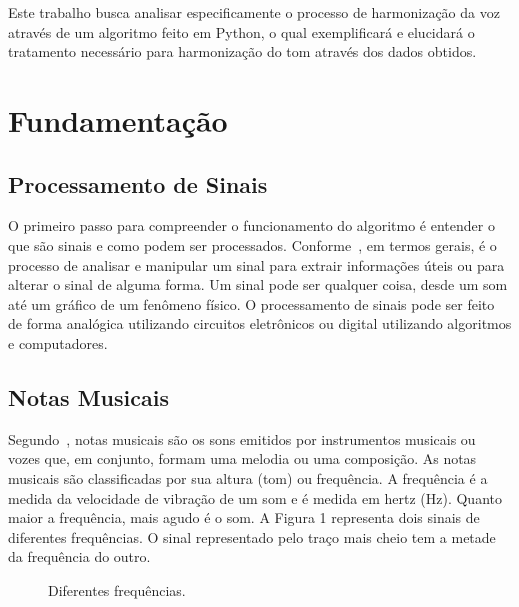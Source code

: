 \documentclass{sbrt}
\begin{document}
Este trabalho busca analisar especificamente o processo de harmonização da voz através de um algoritmo feito em Python,
o qual exemplificará e elucidará o tratamento necessário para harmonização do tom através dos dados obtidos.


\section{Fundamentação}

\subsection{Processamento de Sinais}

O primeiro passo para compreender o funcionamento do algoritmo é entender o que são sinais e como podem ser processados.
Conforme~\cite{prandoni2008signal}, em termos gerais, é o processo de analisar e manipular um sinal para extrair
informações úteis ou para alterar o sinal de alguma forma. Um sinal pode ser qualquer coisa, desde um som até um gráfico
de um fenômeno físico. O processamento de sinais pode ser feito de forma analógica utilizando circuitos eletrônicos ou
digital utilizando algoritmos e computadores.

\subsection{Notas Musicais}

Segundo~\cite{moretti2003prototipo}, notas musicais são os sons emitidos por instrumentos musicais ou vozes que, em
conjunto, formam uma melodia ou uma composição. As notas musicais são classificadas por sua altura (tom) ou frequência.
A frequência é a medida da velocidade de vibração de um som e é medida em hertz (Hz). Quanto maior a frequência, mais
agudo é o som. A Figura 1 representa dois sinais de diferentes frequências. O sinal representado pelo traço mais cheio
tem a metade da frequência do outro.


\begin{figure}[ht]
  \centering
  \caption{\label{fig:sine}Diferentes frequências.}
\end{figure}
\end{document}
